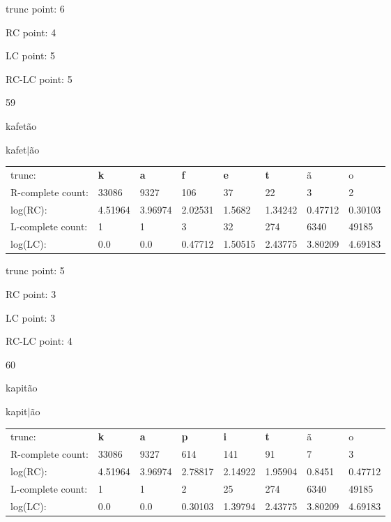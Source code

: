\documentclass{article}
\begin{document}
trunc point: 6

RC point: 4

LC point: 5

RC-LC point: 5

\vspace{3em}



59

kafetão

kafet$|$ão

\vspace{1em}

\begin{tabular}{l|lllllll}

trunc: & {\color{red}\bf k} & {\color{red}\bf a} & {\color{red}\bf f} & {\color{red}\bf e} & {\color{red}\bf t} & ã & o \\ 
R-complete count: & 33086 & 9327 & 106 & 37 & 22 & 3 & 2 \\ 
log(RC): & 4.51964 & 3.96974 & 2.02531 & 1.5682 & 1.34242 & 0.47712 & 0.30103 \\ 
L-complete count: & 1 & 1 & 3 & 32 & 274 & 6340 & 49185 \\ 
log(LC): & 0.0 & 0.0 & 0.47712 & 1.50515 & 2.43775 & 3.80209 & 4.69183 \\ 
\end{tabular}

trunc point: 5

RC point: 3

LC point: 3

RC-LC point: 4

\vspace{3em}



60

kapitão

kapit$|$ão

\vspace{1em}

\begin{tabular}{l|lllllll}

trunc: & {\color{red}\bf k} & {\color{red}\bf a} & {\color{red}\bf p} & {\color{red}\bf i} & {\color{red}\bf t} & ã & o \\ 
R-complete count: & 33086 & 9327 & 614 & 141 & 91 & 7 & 3 \\ 
log(RC): & 4.51964 & 3.96974 & 2.78817 & 2.14922 & 1.95904 & 0.8451 & 0.47712 \\ 
L-complete count: & 1 & 1 & 2 & 25 & 274 & 6340 & 49185 \\ 
log(LC): & 0.0 & 0.0 & 0.30103 & 1.39794 & 2.43775 & 3.80209 & 4.69183 \\ 
\end{tabular}
\end{document}
